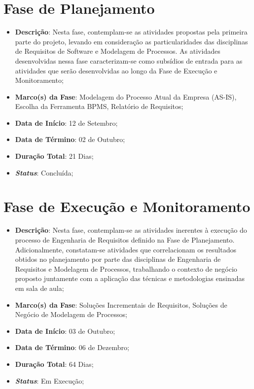 	\section[Fase de Planejamento]{Fase de Planejamento}
	\label{sec:planejamento_cronograma_planejamento}
		\begin{itemize}
			\item{\textbf{Descrição}: Nesta fase, contemplam-se as atividades propostas pela primeira parte do projeto, levando em consideração as particularidades das disciplinas de Requisitos de Software e Modelagem de Processos. As atividades desenvolvidas nessa fase caracterizam-se como subsídios de entrada para as atividades que serão desenvolvidas ao longo da Fase de Execução e  Monitoramento;}
			\item{\textbf{Marco(s) da Fase}: Modelagem do Processo Atual da Empresa (AS-IS), Escolha da Ferramenta BPMS, Relatório de Requisitos;}
			\item{\textbf{Data de Início}: 12 de Setembro;}
			\item{\textbf{Data de Término}: 02 de Outubro;}
			\item{\textbf{Duração Total}: 21 Dias;}
			\item{\textbf{\emph{Status}}: Concluída;}
		\end{itemize}
		

	\section[Fase de Execução e Monitoramento]{Fase de Execução e Monitoramento}
	\label{sec:planejamento_cronograma_execucao}
		\begin{itemize}
			\item{\textbf{Descrição}: Nesta fase, contemplam-se as atividades inerentes à execução do processo de Engenharia de Requisitos definido na Fase de Planejamento. Adicionalmente, constatam-se atividades  que correlacionam os resultados obtidos no planejamento por parte das disciplinas de Engenharia de Requisitos e Modelagem de Processos, trabalhando o contexto de negócio proposto juntamente com a aplicação das técnicas e metodologias ensinadas em sala de aula;}
			\item{\textbf{Marco(s) da Fase}: Soluções Incrementais de Requisitos, Soluções de Negócio de Modelagem de Processos;}
			\item{\textbf{Data de Início}: 03 de Outubro;}
			\item{\textbf{Data de Término}: 06 de Dezembro;}
			\item{\textbf{Duração Total}: 64 Dias;}
			\item{\textbf{\emph{Status}}: Em Execução;}
		\end{itemize}
	
